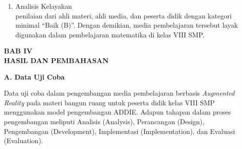 \documentclass[12pt]{article}
\begin{document}
\begin{enumerate}
\begin{enumerate}
        \item Analisis Kelayakan\\
        \hspace*{1cm}penilaian dari ahli materi, ahli media, dan peserta didik dengan kategori minimal “Baik (B)”. Dengan demikian, media pembelajaran tersebut layak digunakan dalam pembelajaran matematika di kelas VIII SMP.
    \end{enumerate}

\end{enumerate}


\newpage
\begin{center}
    \textbf{BAB IV} \\
    \textbf{HASIL DAN PEMBAHASAN}
\end{center}

\textbf{A. Data Uji Coba}

\hspace*{1cm}Data uji coba dalam pengembangan media pembelajaran berbasis \textit{Augmented Reality} pada materi bangun ruang untuk peserta didik kelas VIII SMP menggunakan model pengembangan ADDIE. Adapun tahapan dalam proses pengembangan meliputi Analisis (Analysis), Perancangan (Design), Pengembangan (Development), Implementasi (Implementation), dan Evaluasi (Evaluation).
\end{document}
